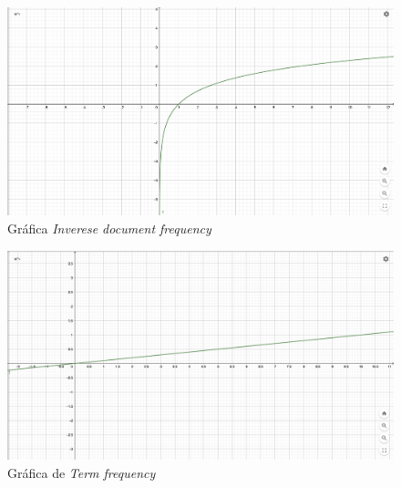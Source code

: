 \begin{itemize}
	\begin{figure}[h]
	\centering
	\includegraphics[scale=.2]{Imagenes/ln.png}	
	\caption{Gráfica \textit{Inverese document frequency}}
	\label{fig:G1-ln}
	\end{figure}


	\begin{figure}[h]
	\centering
	\includegraphics[scale=.2]{Imagenes/x_10.png}
	\caption{Gráfica de \textit{Term frequency}}
	\label{fig:G2-x}
	\end{figure}	




\end{itemize}